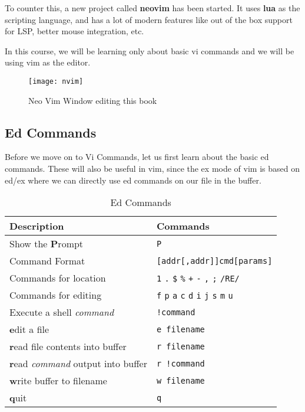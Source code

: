 To counter this, a new project called \textbf{neovim}
has been started.
It uses \textbf{lua} as the scripting language,
and has a lot of modern features like
out of the box support for LSP,
better mouse integration, etc.

In this course, we will be learning only
about basic vi commands and we will be
using vim as the editor.

\begin{figure}[h!]
  \texttt{[image: nvim]}
  \caption{Neo Vim Window editing this book}
\end{figure}


\vfill
\pagebreak

\subsection{Ed Commands}

Before we move on to Vi Commands,
let us first learn about the basic ed commands.
These will also be useful in vim, since the
ex mode of vim is based on ed/ex where we can
directly use ed commands on our file in the buffer.

\begin{table}[h!]
  \caption{Ed Commands}
  \begin{tabular}{l l}
    \toprule
    Description & Commands \\
    \midrule
    Show the \textbf{P}rompt & \texttt{P} \\
    Command Format & \texttt{[addr[,addr]]cmd[params]} \\
    Commands for location & \texttt{1} \texttt{.} \texttt{\$} \texttt{\%} \texttt{+} \texttt{-} \texttt{,} \texttt{;} \texttt{/RE/} \\
    Commands for editing & \texttt{f} \texttt{p} \texttt{a} \texttt{c} \texttt{d} \texttt{i} \texttt{j} \texttt{s} \texttt{m} \texttt{u} \\
    Execute a shell \textit{command} & \texttt{!command} \\
    \textbf{e}dit a file & \texttt{e filename} \\
    \textbf{r}ead file contents into buffer & \texttt{r filename} \\
    \textbf{r}ead \textit{command} output into buffer & \texttt{r !command} \\
    \textbf{w}rite buffer to filename & \texttt{w filename} \\
    \textbf{q}uit & \texttt{q} \\
    \bottomrule
  \end{tabular}
\end{table}

